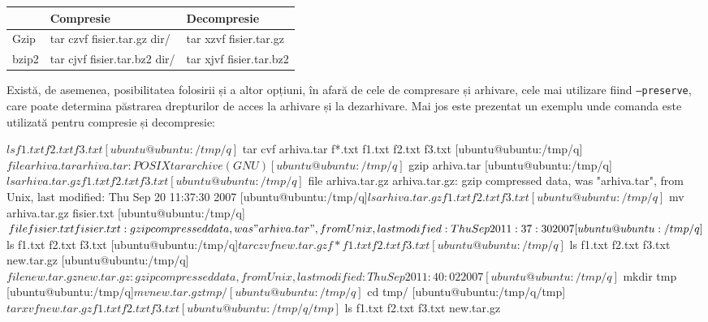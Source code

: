 \begin{table}[htb]
\begin{center}
	\begin{tabular}{ | p{} | p{} |  p{} |}
	\hline
	 & \textbf{Compresie} & \textbf{Decompresie} \\
	\hline
		Gzip & tar czvf fisier.tar.gz dir/ & tar xzvf fisier.tar.gz \\
	\hline
		bzip2 & tar cjvf fisier.tar.bz2 dir/ & tar xjvf fisier.tar.bz2 \\
	\hline
	\end{tabular}
	\label{table:file-system-achivation-cmd}
\end{center}
\end{table}

Există, de asemenea, posibilitatea folosirii și a altor opțiuni, în afară de
cele de compresare și arhivare, cele mai utilizare fiind \texttt{--preserve},
care poate determina păstrarea drepturilor de acces la arhivare și la
dezarhivare. Mai jos este prezentat un exemplu unde comanda  este
utilizată pentru compresie și decompresie:

\begin{screen}
$ ls
f1.txt  f2.txt  f3.txt
[ubuntu@ubuntu:/tmp/q]$ tar cvf arhiva.tar f*.txt
f1.txt
f2.txt
f3.txt
[ubuntu@ubuntu:/tmp/q]$ file arhiva.tar
arhiva.tar: POSIX tar archive (GNU)
[ubuntu@ubuntu:/tmp/q]$ gzip arhiva.tar
[ubuntu@ubuntu:/tmp/q]$ ls
arhiva.tar.gz  f1.txt  f2.txt  f3.txt
[ubuntu@ubuntu:/tmp/q]$ file arhiva.tar.gz
arhiva.tar.gz: gzip compressed data, was "arhiva.tar", from Unix, last modified: Thu Sep 20 11:37:30 2007
[ubuntu@ubuntu:/tmp/q]$ ls
arhiva.tar.gz  f1.txt  f2.txt  f3.txt
[ubuntu@ubuntu:/tmp/q]$ mv arhiva.tar.gz fisier.txt
[ubuntu@ubuntu:/tmp/q]$ file fisier.txt
fisier.txt: gzip compressed data, was "arhiva.tar", from Unix, last modified: Thu Sep 20 11:37:30 2007
[ubuntu@ubuntu:/tmp/q]$ ls
f1.txt  f2.txt  f3.txt
[ubuntu@ubuntu:/tmp/q]$ tar czvf new.tar.gz f*
f1.txt
f2.txt
f3.txt
[ubuntu@ubuntu:/tmp/q]$ ls
f1.txt  f2.txt  f3.txt  new.tar.gz
[ubuntu@ubuntu:/tmp/q]$ file new.tar.gz
new.tar.gz: gzip compressed data, from Unix, last modified: Thu Sep 20 11:40:02 2007
[ubuntu@ubuntu:/tmp/q]$ mkdir tmp
[ubuntu@ubuntu:/tmp/q]$ mv new.tar.gz tmp/
[ubuntu@ubuntu:/tmp/q]$ cd tmp/
[ubuntu@ubuntu:/tmp/q/tmp]$ tar xvf new.tar.gz
f1.txt
f2.txt
f3.txt
[ubuntu@ubuntu:/tmp/q/tmp]$ ls
f1.txt  f2.txt  f3.txt  new.tar.gz
\end{screen}

